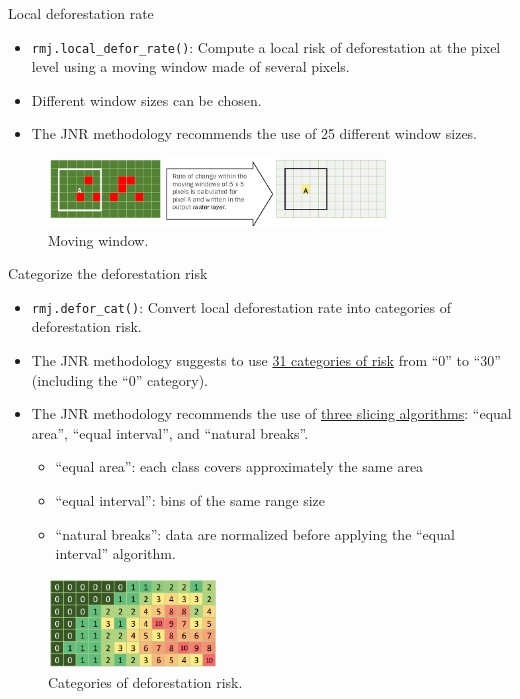 \documentclass[10pt,table,dvipsnames,compress]{beamer}
\begin{document}
\begin{frame}[label={sec:org32c66c6},fragile]{Local deforestation rate}
 \begin{itemize}
\item \texttt{rmj.local\_defor\_rate()}: Compute a local risk of deforestation at the pixel level using a moving window made of several pixels.
\item Different window sizes can be chosen.
\item The JNR methodology recommends the use of 25 different window sizes.
\end{itemize}

\begin{figure}[htbp]
\centering
\includegraphics[width=0.8\textwidth]{figs/moving_window.png}
\caption{\label{fig:orge557364}Moving window.}
\end{figure}
\end{frame}

\begin{frame}[label={sec:org741fa91},fragile]{Categorize the deforestation risk}
 \begin{itemize}
\item \texttt{rmj.defor\_cat()}: Convert local deforestation rate into categories of deforestation risk.
\item The JNR methodology suggests to use \uline{31 categories of risk} from ``0'' to ``30'' (including the ``0'' category).
\item The JNR methodology recommends the use of \uline{three slicing algorithms}: ``equal area'', ``equal interval'', and ``natural breaks''.
\begin{itemize}
\item ``equal area'': each class covers approximately the same area
\item ``equal interval'': bins of the same range size
\item ``natural breaks'': data are normalized before applying the ``equal interval'' algorithm.
\end{itemize}
\end{itemize}

\begin{figure}[htbp]
\centering
\includegraphics[width=0.4\textwidth]{figs/categories.png}
\caption{\label{fig:orgd34ebc0}Categories of deforestation risk.}
\end{figure}
\end{frame}
\end{document}
